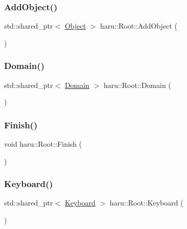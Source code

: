 \subsubsection{\texorpdfstring{Add\+Object()}{AddObject()}}
{\footnotesize\ttfamily std\+::shared\+\_\+ptr$<$ \mbox{\hyperlink{classharu_1_1_object}{Object}} $>$ haru\+::\+Root\+::\+Add\+Object (\begin{DoxyParamCaption}{ }\end{DoxyParamCaption})}

\mbox{\label{classharu_1_1_root_a1fd00f081aeeaf09eea1347bdd22ba2a}} 
\subsubsection{\texorpdfstring{Domain()}{Domain()}}
{\footnotesize\ttfamily std\+::shared\+\_\+ptr$<$ \mbox{\hyperlink{class_domain}{Domain}} $>$ haru\+::\+Root\+::\+Domain (\begin{DoxyParamCaption}{ }\end{DoxyParamCaption})\hspace{0.3cm}{\ttfamily [private]}}

\mbox{\label{classharu_1_1_root_aa0767148d14c4c9bc06bf41d3a44188f}} 
\subsubsection{\texorpdfstring{Finish()}{Finish()}}
{\footnotesize\ttfamily void haru\+::\+Root\+::\+Finish (\begin{DoxyParamCaption}{ }\end{DoxyParamCaption})}

\mbox{\label{classharu_1_1_root_a4d3ca0f98e581f98868f76e003c6d710}} 
\subsubsection{\texorpdfstring{Keyboard()}{Keyboard()}}
{\footnotesize\ttfamily std\+::shared\+\_\+ptr$<$ \mbox{\hyperlink{class_keyboard}{Keyboard}} $>$ haru\+::\+Root\+::\+Keyboard (\begin{DoxyParamCaption}{ }\end{DoxyParamCaption})\hspace{0.3cm}{\ttfamily [private]}}

